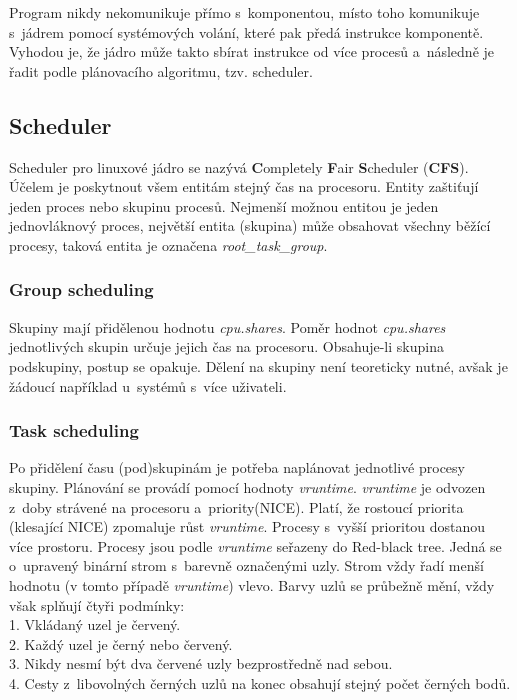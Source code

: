 \documentclass[12pt,a4paper,twoside,]{article}
\begin{document}
{{{{{{{Program nikdy nekomunikuje přímo s~komponentou, místo toho komunikuje s~jádrem pomocí systémových volání, které pak předá instrukce komponentě. Vyhodou je, že jádro může takto sbírat instrukce od více procesů a~následně je řadit podle plánovacího algoritmu, tzv. scheduler.

\subsection{\textsf{Scheduler}}
Scheduler pro linuxové jádro se nazývá {\bf C}ompletely {\bf F}air {\bf S}cheduler ({\bf CFS}). Účelem je poskytnout všem entitám stejný čas na procesoru. Entity zaštiťují jeden proces nebo skupinu procesů. Nejmenší možnou entitou je jeden jednovláknový proces, největší entita (skupina) může obsahovat všechny běžící procesy, taková entita je označena \textit{root\_task\_group}. 
\subsubsection{\textsf{Group scheduling}}
Skupiny mají přidělenou hodnotu \textit{cpu.shares}. Poměr hodnot \textit{cpu.shares} jednotlivých skupin určuje jejich čas na procesoru. Obsahuje-li skupina podskupiny, postup se opakuje. Dělení na skupiny není teoreticky nutné, avšak je žádoucí například u~systémů s~více uživateli.

\subsubsection{\textsf{Task scheduling}}
Po přidělení času (pod)skupinám je potřeba naplánovat jednotlivé procesy skupiny. Plánování se provádí pomocí hodnoty \textit{vruntime}. \textit{vruntime} je odvozen z~doby strávené na procesoru a~priority(NICE). Platí, že rostoucí priorita (klesající NICE) zpomaluje růst \textit{vruntime}. Procesy s~vyšší prioritou dostanou více prostoru. Procesy jsou podle \textit{vruntime} seřazeny do Red-black tree. Jedná se o~upravený binární strom s~barevně označenými uzly. Strom vždy řadí menší hodnotu (v tomto případě \textit{vruntime}) vlevo. Barvy uzlů se průbežně mění, vždy však splňují čtyři podmínky:\\
1. Vkládaný uzel je červený.\\2. Každý uzel je černý nebo červený.\\3. Nikdy nesmí být dva červené uzly bezprostředně nad sebou.\\4. Cesty z~libovolných černých uzlů na konec obsahují stejný počet černých bodů. \\ 

}}}}}}}
\end{document}
